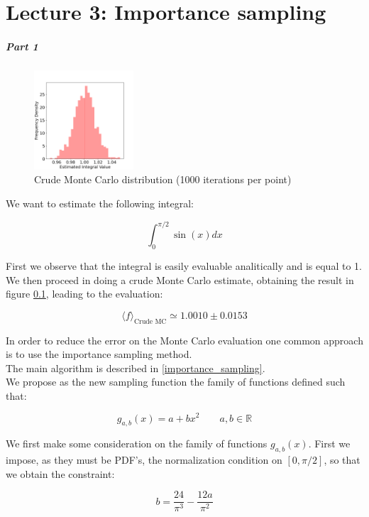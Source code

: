 
\chapter*{Lecture 3: Importance sampling}

\paragraph{Part 1}

\begin{figure}
    \centering
    \includegraphics[width=0.33\textwidth]{FIG/exercise_3_images/crude_mc.png}
  \caption{Crude Monte Carlo distribution (1000 iterations per point)}
  \label{crude_mc}
  \end{figure}

We want to estimate the following integral:

$$ \int_0^{\pi/2} \sin(x) dx $$

First we observe that the integral is easily evaluable analitically and is equal to 1. \\
We then proceed in doing a crude Monte Carlo estimate, obtaining the result in figure \ref{crude_mc}, leading to the evaluation:

$$ \langle f \rangle_{\text{Crude MC}} \simeq 1.0010 \pm 0.0153 $$

In order to reduce the error on the Monte Carlo evaluation one common approach is to use the importance sampling method. \\
The main algorithm is described in \ref{importance_sampling}. \\
We propose as the new sampling function the family of functions defined such that:

$$ g_{a,b}(x) = a+ bx^2 \qquad a,b \in \mathbb{R}  $$

We first make some consideration on the family of functions $g_{a,b}(x)$.
First we impose, as they must be PDF's, the normalization condition on $[0, \pi/2]$, so that we obtain the constraint:

$$ b = \frac{24}{\pi^3} - \frac{12 a}{\pi^2} $$

